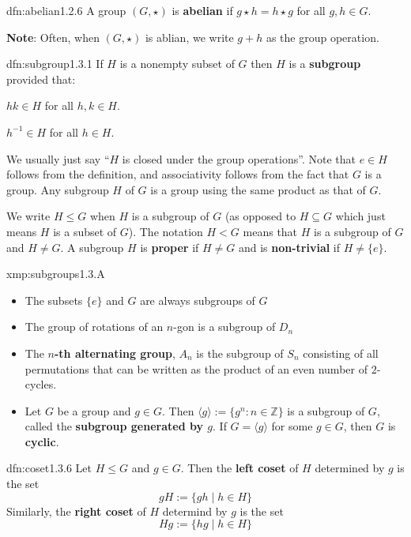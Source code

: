\documentclass[landscape, 8pt]{extarticle}
\begin{document}
\begin{multicols*}{3}
\begin{dfn}{dfn:abelian}{1.2.6}
	A group $(G, \star)$ is \textbf{abelian} if $g \star h = h \star g$ for all $g, h\in G$.

	\textbf{Note}: Often, when $(G, \star)$ is ablian, we write $g+h$ as the group operation.
\end{dfn}

\begin{dfn}[Subgroup]{dfn:subgroup}{1.3.1}
	If $H$ is a nonempty subset of $G$ then $H$ is a \textbf{subgroup} provided that:
	\begin{itemize-zero}
	    \item $hk \in H$ for all $h, k\in H$.
	    \item $h^{-1} \in H$ for all $h\in H$.
	\end{itemize-zero}

	We usually just say ``$H$ is closed under the group operations''. Note that $e\in H$ follows from the definition, and associativity follows from the fact that $G$ is a group. Any subgroup $H$ of $G$ is a group using the same product as that of $G$.

	We write $H \le G$ when $H$ is a subgroup of $G$ (as opposed to $H \subseteq G$ which just means $H$ is a subset of $G$). The notation $H < G$ means that $H$ is a subgroup of $G$ and $H \ne G$. A subgroup $H$ is \textbf{proper} if $H \ne G$ and is \textbf{non-trivial} if $H \ne \{e\}$.
\end{dfn}

\begin{xmp}{xmp:subgroups}{1.3.A}
	\begin{itemize}
	    \item[\textbf{1.3.2})] The subsets $\{e\}$ and $G$ are always subgroups of $G$
		\item[\textbf{1.3.3})] The group of rotations of an $n$-gon is a subgroup of $D_{n}$
		\item[\textbf{1.3.4})] The \textbf{$n$-th alternating group}, $A_{n}$ is the subgroup of $S_{n}$ consisting of all permutations that can be written as the product of an even number of $2$-cycles.
		\item[\textbf{1.3.5})] Let $G$ be a group and $g\in G$. Then $\langle g \rangle := \{g^{n} : n \in \mathbb{Z}\}$ is a subgroup of $G$, called the \textbf{subgroup generated by $g$}. If $G = \langle g \rangle$ for some $g\in G$, then $G$ is \textbf{cyclic}.
	\end{itemize}
\end{xmp}

\begin{dfn}[Coset]{dfn:coset}{1.3.6}
	Let $H \le G$ and $g\in G$. Then the \textbf{left coset} of $H$ determined by $g$ is the set 
	\[gH := \{gh \mid h\in H\}\]
	Similarly, the \textbf{right coset} of $H$ determind by $g$ is the set
	\[Hg := \{hg \mid h\in H\}\]
\end{dfn}


\end{multicols*}
\end{document}
